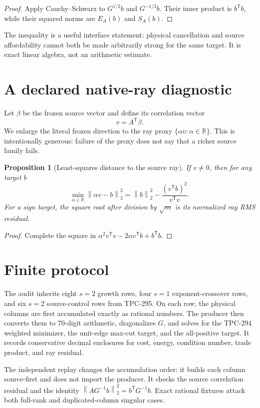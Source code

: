 \documentclass[10pt]{article}
\newtheorem{proposition}{Proposition}
\newcommand{\R}{\mathbb{R}}
\newcommand{\norm}[1]{\left\lVert #1\right\rVert}
\begin{document}
\begin{proof}
Apply Cauchy--Schwarz to $G^{1/2}b$ and $G^{-1/2}b$.  Their inner product
is $b^{\mathsf T}b$, while their squared norms are $E_A(b)$ and
$S_A(b)$.
\end{proof}

The inequality is a useful interface statement: physical cancellation and
source affordability cannot both be made arbitrarily strong for the same
target.  It is exact linear algebra, not an arithmetic estimate.

\section{A declared native-ray diagnostic}

Let $\beta$ be the frozen source vector and define its correlation vector
\[
 v=A^{\mathsf T}\beta.
\]
We enlarge the literal frozen direction to the ray proxy
$\{\alpha v:\alpha\in\R\}$.  This is intentionally generous: failure of
the proxy does not say that a richer source family fails.

\begin{proposition}[Least-squares distance to the source ray]
If $v\ne0$, then for any target $b$
\[
 \min_{\alpha\in\R}\norm{\alpha v-b}_2^2
 =\norm{b}_2^2-\frac{(v^{\mathsf T}b)^2}{v^{\mathsf T}v}.
 \label{eq:ray}
\]
For a sign target, the square root after division by $\sqrt{m}$ is its
normalized ray RMS residual.
\end{proposition}

\begin{proof}
Complete the square in
$\alpha^2v^{\mathsf T}v-2\alpha v^{\mathsf T}b+b^{\mathsf T}b$.
\end{proof}

\section{Finite protocol}

The audit inherits eight $s=2$ growth rows, four $s=1$ exponent-crossover
rows, and six $s=2$ source-control rows from TPC-295.  On each row, the
physical columns are first accumulated exactly as rational numbers.  The
producer then converts them to 70-digit arithmetic, diagonalizes $G$, and
solves for the TPC-294 weighted minimizer, the unit-edge max-cut target, and
the all-positive target.  It records conservative decimal enclosures for
cost, energy, condition number, trade product, and ray residual.

The independent replay changes the accumulation order: it builds each
column source-first and does not import the producer.  It checks the source
correlation residual and the identity
$\norm{AG^{-1}b}_2^2=b^{\mathsf T}G^{-1}b$.  Exact rational fixtures attack
both full-rank and duplicated-column singular cases.
\end{document}
